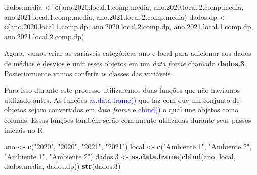 \documentclass[14pt,titlepage, oneside, openany, a4paper]{book}
\newenvironment{Shaded}{\begin{snugshade}}{\end{snugshade}}
\newcommand{\FloatTok}[1]{\textcolor[rgb]{0.00,0.00,0.81}{#1}}
\newcommand{\KeywordTok}[1]{\textcolor[rgb]{0.13,0.29,0.53}{\textbf{#1}}}
\newcommand{\NormalTok}[1]{#1}
\newcommand{\StringTok}[1]{\textcolor[rgb]{0.31,0.60,0.02}{#1}}
\begin{document}
\begin{Shaded}
\begin{Highlighting}[]
\NormalTok{dados.media <-}\StringTok{ }\KeywordTok{c}\NormalTok{(ano.}\FloatTok{2020.}\NormalTok{local.}\FloatTok{1.}\NormalTok{comp.media,}
\NormalTok{                 ano.}\FloatTok{2020.}\NormalTok{local.}\FloatTok{2.}\NormalTok{comp.media,}
\NormalTok{                 ano.}\FloatTok{2021.}\NormalTok{local.}\FloatTok{1.}\NormalTok{comp.media,}
\NormalTok{                 ano.}\FloatTok{2021.}\NormalTok{local.}\FloatTok{2.}\NormalTok{comp.media)}
\NormalTok{dados.dp <-}\StringTok{ }\KeywordTok{c}\NormalTok{(ano.}\FloatTok{2020.}\NormalTok{local.}\FloatTok{1.}\NormalTok{comp.dp,}
\NormalTok{              ano.}\FloatTok{2020.}\NormalTok{local.}\FloatTok{2.}\NormalTok{comp.dp,}
\NormalTok{              ano.}\FloatTok{2021.}\NormalTok{local.}\FloatTok{1.}\NormalTok{comp.dp,}
\NormalTok{              ano.}\FloatTok{2021.}\NormalTok{local.}\FloatTok{2.}\NormalTok{comp.dp)}
\end{Highlighting}
\end{Shaded}

Agora, vamos criar as variáveis categóricas ano e local para adicionar aos dados de médias e desvios e unir esses objetos em um \emph{data frame} chamado \textbf{dados.3}. Posteriormente vamos conferir as classes das variáveis.

Para isso durante este processo utilizaremos duas funções que não haviamos utilizado antes. As funções \textcolor{blue}{as.data.frame()} que faz com que um conjunto de objetos sejam convertidos em \emph{data frame} e \textcolor{blue}{cbind()} o qual une objetos como colunas. Essas funções também serão comumente utilizadas durante seus passos iniciais no R.

\begin{Shaded}
\begin{Highlighting}[]
\NormalTok{ano <-}\StringTok{ }\KeywordTok{c}\NormalTok{(}\StringTok{"2020"}\NormalTok{, }\StringTok{"2020"}\NormalTok{, }\StringTok{"2021"}\NormalTok{, }\StringTok{"2021"}\NormalTok{)}
\NormalTok{local <-}\StringTok{ }\KeywordTok{c}\NormalTok{(}\StringTok{"Ambiente 1"}\NormalTok{, }\StringTok{"Ambiente 2"}\NormalTok{, }\StringTok{"Ambiente 1"}\NormalTok{, }\StringTok{"Ambiente 2"}\NormalTok{)}
\NormalTok{dados}\FloatTok{.3}\NormalTok{ <-}\StringTok{ }\KeywordTok{as.data.frame}\NormalTok{(}\KeywordTok{cbind}\NormalTok{(ano, local, dados.media, dados.dp))}
\KeywordTok{str}\NormalTok{(dados}\FloatTok{.3}\NormalTok{)}
\end{Highlighting}
\end{Shaded}
\end{document}
